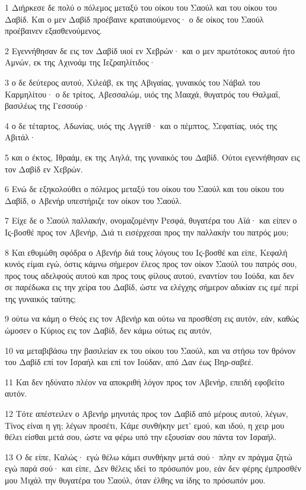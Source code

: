 \par 1 Διήρκεσε δε πολύ ο πόλεμος μεταξύ του οίκου του Σαούλ και του οίκου του Δαβίδ. Και ο μεν Δαβίδ προέβαινε κραταιούμενος· ο δε οίκος του Σαούλ προέβαινεν εξασθενούμενος.
\par 2 Εγεννήθησαν δε εις τον Δαβίδ υιοί εν Χεβρών· και ο μεν πρωτότοκος αυτού ήτο Αμνών, εκ της Αχινοάμ της Ιεζραηλίτιδος·
\par 3 ο δε δεύτερος αυτού, Χιλεάβ, εκ της Αβιγαίας, γυναικός του Νάβαλ του Καρμηλίτου· ο δε τρίτος, Αβεσσαλώμ, υιός της Μααχά, θυγατρός του Θαλμαΐ, βασιλέως της Γεσσούρ·
\par 4 ο δε τέταρτος, Αδωνίας, υιός της Αγγείθ· και ο πέμπτος, Σεφατίας, υιός της Αβιτάλ·
\par 5 και ο έκτος, Ιθραάμ, εκ της Αιγλά, της γυναικός του Δαβίδ. Ούτοι εγεννήθησαν εις τον Δαβίδ εν Χεβρών.
\par 6 Ενώ δε εξηκολούθει ο πόλεμος μεταξύ του οίκου του Σαούλ και του οίκου του Δαβίδ, ο Αβενήρ υπεστήριζε τον οίκον του Σαούλ.
\par 7 Είχε δε ο Σαούλ παλλακήν, ονομαζομένην Ρεσφά, θυγατέρα του Αϊά· και είπεν ο Ις-βοσθέ προς τον Αβενήρ, Διά τι εισέρχεσαι προς την παλλακήν του πατρός μου;
\par 8 Και εθυμώθη σφόδρα ο Αβενήρ διά τους λόγους του Ις-βοσθέ και είπε, Κεφαλή κυνός είμαι εγώ, όστις κάμνω σήμερον έλεος προς τον οίκον Σαούλ του πατρός σου, προς τους αδελφούς αυτού και προς τους φίλους αυτού, εναντίον του Ιούδα, και δεν σε παρέδωκα εις την χείρα του Δαβίδ, ώστε να ελέγχης σήμερον αδικίαν εις εμέ περί της γυναικός ταύτης;
\par 9 ούτω να κάμη ο Θεός εις τον Αβενήρ και ούτω να προσθέση εις αυτόν, εάν, καθώς ώμοσεν ο Κύριος εις τον Δαβίδ, δεν κάμω ούτως εις αυτόν,
\par 10 να μεταβιβάσω την βασιλείαν εκ του οίκου του Σαούλ, και να στήσω τον θρόνον του Δαβίδ επί τον Ισραήλ και επί τον Ιούδαν, από Δαν έως Βηρ-σαβεέ.
\par 11 Και δεν ηδύνατο πλέον να αποκριθή λόγον προς τον Αβενήρ, επειδή εφοβείτο αυτόν.
\par 12 Τότε απέστειλεν ο Αβενήρ μηνυτάς προς τον Δαβίδ από μέρους αυτού, λέγων, Τίνος είναι η γη; λέγων προσέτι, Κάμε συνθήκην μετ' εμού, και ιδού, η χειρ μου θέλει είσθαι μετά σου, ώστε να φέρω υπό την εξουσίαν σου πάντα τον Ισραήλ.
\par 13 Ο δε είπε, Καλώς· εγώ θέλω κάμει συνθήκην μετά σού· πλην εν πράγμα ζητώ εγώ παρά σού· και είπε, Δεν θέλεις ιδεί το πρόσωπόν μου, εάν δεν φέρης έμπροσθέν μου Μιχάλ την θυγατέρα του Σαούλ, όταν έλθης να ίδης το πρόσωπόν μου.
